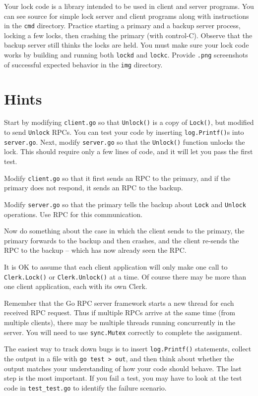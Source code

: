 \documentclass{article}
\newcommand{\code}{\texttt}
\begin{document}
Your lock code is a library intended to be used in client and server programs. You can see source for simple lock server and client programs along with instructions in the \code{cmd} directory. Practice starting a primary and a backup server process, locking a few locks, then crashing the primary (with control-C). Observe that the backup server still thinks the locks are held. You must make sure your lock code works by building and running both \code{lockd} and \code{lockc}. Provide \code{.png} screenshots of successful expected behavior in the \code{img} directory.

\section{Hints}
Start by modifying \code{client.go} so that \code{Unlock()} is a copy of \code{Lock()}, but modified to send \code{Unlock} RPCs. You can test your code by inserting \code{log.Printf()}s into \code{server.go}.
Next, modify \code{server.go} so that the \code{Unlock()} function unlocks the lock. This should require only a few lines of code, and it will let you pass the first test.

Modify \code{client.go} so that it first sends an RPC to the primary, and if the primary does not respond, it sends an RPC to the backup.

Modify \code{server.go} so that the primary tells the backup about \code{Lock} and \code{Unlock} operations. Use RPC for this communication.

Now do something about the case in which the client sends to the primary, the primary forwards to the backup and then crashes, and the client re-sends the RPC to the backup -- which has now already seen the RPC.

It is OK to assume that each client application will only make one call to \code{Clerk.Lock()} or \code{Clerk.Unlock()} at a time. Of course there may be more than one client application, each with its own Clerk.

Remember that the Go RPC server framework starts a new thread for each received RPC request. Thus if multiple RPCs arrive at the same time (from multiple clients), there may be multiple threads running concurrently in the server. You will need to use \code{sync.Mutex} correctly to complete the assignment.

The easiest way to track down bugs is to insert \code{log.Printf()} statements, collect the output in a file with \code{go test > out}, and then think about whether the output matches your understanding of how your code should behave. The last step is the most important.
If you fail a test, you may have to look at the test code in \code{test\_test.go} to identify the failure scenario.
\end{document}
